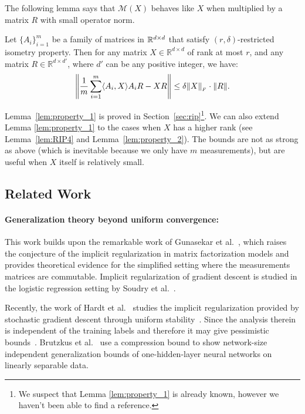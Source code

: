 \noindent The following lemma says that $\mathcal{M}(X)$ behaves like $X$ when multiplied by a matrix $R$ with small operator norm.  
\begin{lem}\label{lem:property_1}
	Let $\{A_i\}_{i=1}^m$ be a family of matrices in $\mathbb{R}^{d \times d}$ that
	satisfy $(r, \delta)$-restricted isometry property.
	Then for any matrix $X \in \mathbb{R}^{d \times d}$ of rank at most $r$,
	and any matrix $R \in \mathbb{R}^{d \times d'}$, where $d'$ can be any positive integer,
	we have:
	\[ \left\| \frac{1}{m}\sum_{i = 1}^m \langle {A}_i , {X} \rangle {A}_i  {R} - {X} {R} \right\| \leq  \delta \|X\|_{_{F}} \cdot \|R\|. \]
\end{lem}
\noindent Lemma~\ref{lem:property_1} is proved in Section~\ref{sec:rip}\footnote{We suspect that Lemma \ref{lem:property_1} is already known, however we haven't been able to find a reference.}. We can also extend Lemma \ref{lem:property_1} to the cases when $X$ has a higher rank (see Lemma~\ref{lem:RIP4} and Lemma~\ref{lem:property_2}). The bounds are not as strong as above (which is inevitable because we only have $m$ measurements), but are useful when $X$ itself is relatively small. 



\subsection{Related Work}

\paragraph{Generalization theory beyond uniform convergence: } 
This work builds upon the remarkable work of Gunasekar et al.~\cite{gunasekar2017implicit}, which raises the conjecture of the implicit regularization in matrix factorization models and provides theoretical evidence for the simplified setting where the measurements matrices are commutable.  Implicit regularization of gradient descent is studied in the logistic regression setting by Soudry et al.~\cite{soudry2017implicit}.

Recently, the work of Hardt et al.~\cite{hardt2015train} studies the implicit regularization provided by stochastic gradient descent through uniform stability~\cite{bousquet2002stability,mukherjee2006learning,shalev2010learnability}. Since the analysis therein is independent of the training labels and therefore it may give pessimistic bounds~\cite{zhang2017learnability}. Brutzkus et al.~\cite{brutzkus2017sgd} use a compression bound to show network-size independent generalization bounds of one-hidden-layer neural networks on linearly separable data. 

